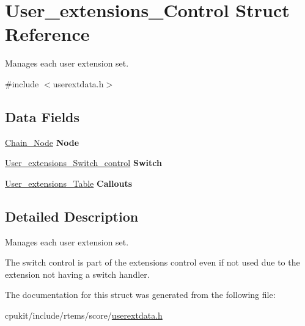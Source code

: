 \hypertarget{structUser__extensions__Control}{}\section{User\+\_\+extensions\+\_\+\+Control Struct Reference}
\label{structUser__extensions__Control}


Manages each user extension set.  




{\ttfamily \#include $<$userextdata.\+h$>$}

\subsection*{Data Fields}
\begin{DoxyCompactItemize}
\item 
\mbox{\label{structUser__extensions__Control_a56097800f2c3ce9c123d7ca16925124c}} 
\mbox{\hyperlink{group__RTEMSScoreChain_ga0dd4bfcca1ac7f90de2842e447846d3d}{Chain\+\_\+\+Node}} {\bfseries Node}
\item 
\mbox{\label{structUser__extensions__Control_a8a3f5ce599beaba57dd635d1b177d28e}} 
\mbox{\hyperlink{structUser__extensions__Switch__control}{User\+\_\+extensions\+\_\+\+Switch\+\_\+control}} {\bfseries Switch}
\item 
\mbox{\label{structUser__extensions__Control_acff4313003ac1499a4ce00acae5c6c2b}} 
\mbox{\hyperlink{structUser__extensions__Table}{User\+\_\+extensions\+\_\+\+Table}} {\bfseries Callouts}
\end{DoxyCompactItemize}


\subsection{Detailed Description}
Manages each user extension set. 

The switch control is part of the extensions control even if not used due to the extension not having a switch handler. 

The documentation for this struct was generated from the following file\+:\begin{DoxyCompactItemize}
\item 
cpukit/include/rtems/score/\mbox{\hyperlink{userextdata_8h}{userextdata.\+h}}\end{DoxyCompactItemize}
